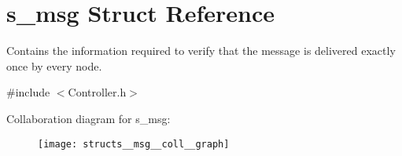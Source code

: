 \hypertarget{structs__msg}{}\section{s\+\_\+msg Struct Reference}
\label{structs__msg}


Contains the information required to verify that the message is delivered exactly once by every node.  




{\ttfamily \#include $<$Controller.\+h$>$}



Collaboration diagram for s\+\_\+msg\+:\nopagebreak
\begin{figure}[H]
\begin{center}
\leavevmode
\texttt{[image: structs\_\_msg\_\_coll\_\_graph]}
\end{center}
\end{figure}
